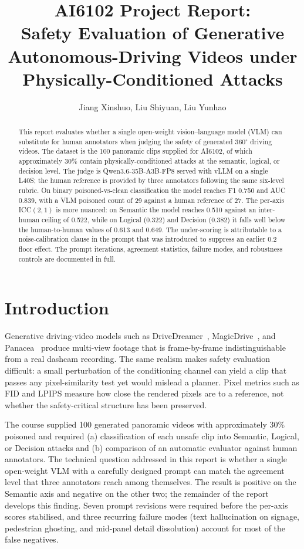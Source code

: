 \documentclass[letterpaper]{article}
\title{AI6102 Project Report:\\Safety Evaluation of Generative Autonomous-Driving Videos under Physically-Conditioned Attacks}
\author{
Jiang Xinshuo, Liu Shiyuan, Liu Yunhao
}
\begin{document}
\maketitle

\begin{abstract}
This report evaluates whether a single open-weight vision--language
model (VLM) can substitute for human annotators when judging the
safety of generated 360$^\circ$ driving videos. The dataset is the
100 panoramic clips supplied for AI6102, of which approximately 30\%
contain physically-conditioned attacks at the semantic, logical, or
decision level. The judge is Qwen3.6-35B-A3B-FP8 served with vLLM on
a single L40S; the human reference is provided by three annotators
following the same six-level rubric. On binary poisoned-vs-clean
classification the model reaches F1 0.750 and AUC 0.839, with a VLM
poisoned count of 29 against a human reference of 27.
The per-axis ICC$(2,1)$ is more nuanced:
on Semantic the model reaches 0.510 against an inter-human ceiling
of 0.522, while on Logical (0.322) and Decision (0.382) it falls
well below the human-to-human values of 0.613 and 0.649.
The under-scoring is attributable to a noise-calibration clause in
the prompt that was introduced to suppress an earlier 0.2 floor
effect. The prompt iterations, agreement statistics, failure modes,
and robustness controls are documented in full.
\end{abstract}

\section{Introduction}
Generative driving-video models such as
DriveDreamer~\citep{wang2024drivedreamer},
MagicDrive~\citep{gao2024magicdrive}, and Panacea~\citep{wen2024panacea}
produce multi-view footage that is frame-by-frame indistinguishable
from a real dashcam recording. The same realism makes safety
evaluation difficult: a small perturbation of the conditioning channel
can yield a clip that passes any pixel-similarity test yet would
mislead a planner. Pixel metrics such as FID and LPIPS measure how
close the rendered pixels are to a reference, not whether the
safety-critical structure has been preserved.

The course supplied 100 generated panoramic videos with approximately
30\% poisoned and required (a) classification of each unsafe clip
into Semantic, Logical, or Decision attacks and (b) comparison of an
automatic evaluator against human annotators. The technical question
addressed in this report is whether a single open-weight VLM with a
carefully designed prompt can match the agreement level that three
annotators reach among themselves. The result is positive on the
Semantic axis and negative on the other two; the remainder of the
report develops this finding. Seven prompt revisions were required
before the per-axis scores stabilised, and three recurring failure
modes (text hallucination on signage, pedestrian ghosting, and
mid-panel detail dissolution) account for most of the false negatives.
\end{document}
